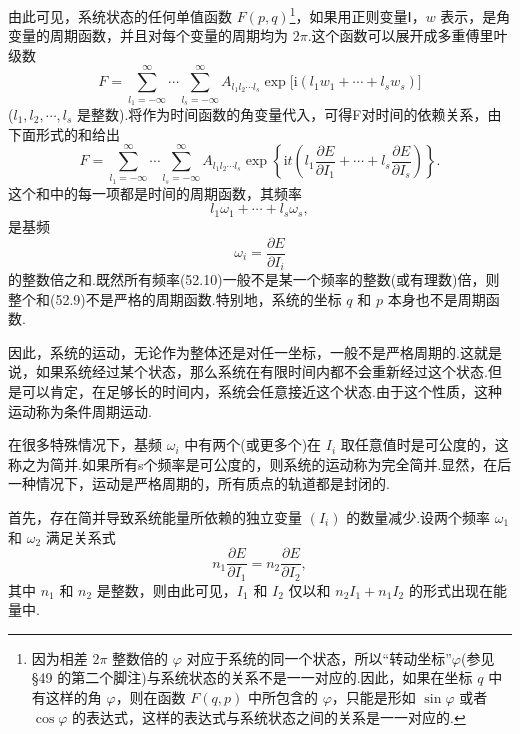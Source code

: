 由此可见，系统状态的任何单值函数 $F(p,q)$\footnote{因为相差 $2\pi$ 整数倍的 $\varphi$ 对应于系统的同一个状态，所以“转动坐标”$\varphi$(参见§49 的第二个脚注)与系统状态的关系不是一一对应的.因此，如果在坐标 $q$ 中有这样的角 $\varphi$，则在函数 $F(q,p)$ 中所包含的 $\varphi$，只能是形如 $\sin\varphi$ 或者 $\cos\varphi$ 的表达式，这样的表达式与系统状态之间的关系是一一对应的.}，如果用正则变量Ⅰ，$w$
表示，是角变量的周期函数，并且对每个变量的周期均为 $2\pi$.这个函数可以展开成多重傅里叶级数
\begin{equation*}
  F=\sum_{l_1=-\infty}^{\infty}\cdots\sum_{l_s=-\infty}^{\infty}
  A_{l_1l_2\cdots l_s}
  \exp\bigl[\mathrm{i}(l_1w_1+\cdots+l_sw_s)\bigr]
\end{equation*}
($l_1,l_2,\cdots,l_s$
是整数).将作为时间函数的角变量代入，可得F对时间的依赖关系，由下面形式的和给出
\begin{equation}
  F=\sum_{l_1=-\infty}^{\infty}\cdots\sum_{l_s=-\infty}^{\infty}
  A_{l_1l_2\cdots l_s}
  \exp\left\{\mathrm{i}t\left(l_1\frac{\partial E}{\partial I_1}
  +\cdots+l_s\frac{\partial E}{\partial I_s}\right)\right\}.
\end{equation}
这个和中的每一项都是时间的周期函数，其频率
\begin{equation}
  l_1\omega_1+\cdots+l_s\omega_s,
\end{equation}
是基频
\begin{equation}
  \omega_i=\frac{\partial E}{\partial I_i}
\end{equation}
的整数倍之和.既然所有频率(52.10)一般不是某一个频率的整数(或有理数)倍，则整个和(52.9)不是严格的周期函数.特别地，系统的坐标
$q$ 和 $p$ 本身也不是周期函数.

因此，系统的运动，无论作为整体还是对任一坐标，一般不是严格周期的.这就是说，如果系统经过某个状态，那么系统在有限时间内都不会重新经过这个状态.但是可以肯定，在足够长的时间内，系统会任意接近这个状态.由于这个性质，这种运动称为条件周期运动.

在很多特殊情况下，基频 $\omega_i$ 中有两个(或更多个)在 $I_i$
取任意值时是可公度的，这称之为简并.如果所有s个频率是可公度的，则系统的运动称为完全简并.显然，在后一种情况下，运动是严格周期的，所有质点的轨道都是封闭的.

首先，存在简并导致系统能量所依赖的独立变量 $(I_i)$
的数量减少.设两个频率 $\omega_1$ 和 $\omega_2$ 满足关系式
\begin{equation}
  n_1\frac{\partial E}{\partial I_1}=n_2\frac{\partial E}{\partial I_2},
\end{equation}
其中 $n_1$ 和 $n_2$
是整数，则由此可见，$I_1$ 和 $I_2$
仅以和 $n_2I_1+n_1I_2$ 的形式出现在能量中.

